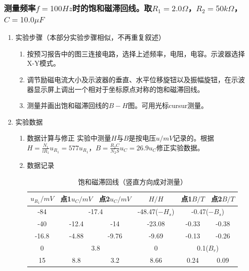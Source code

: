 \documentclass[11pt]{article}
\begin{document}
\subsubsection{测量频率$f=100Hz$时的饱和磁滞回线。取$R_1=2.0\Omega$，$R_2=50k\Omega$，$C=10.0\mu F$}
\begin{enumerate}
    \item 实验步骤（本部分实验步骤相似，不再重复叙述）
    \begin{enumerate}
        \item 按预习报告中的图三连接电路，选择上述频率，电阻，电容。示波器选择X-Y模式。
        \item 调节励磁电流大小及示波器的垂直、水平位移旋钮以及振幅旋钮，在示波器显示屏上调出一个相对于坐标原点对称的饱和磁滞回线。
        \item 测量并画出饱和磁滞回线的$B-H$图。可用光标cursur测量。
    \end{enumerate}
    \item 实验数据
    \begin{enumerate}
        \item 数据计算与修正
        \newline \hspace*{2em}实验中测量$H$与$B$是按电压$u/mV$记录的。根据$H=\frac{N_1}{lR_1}u_{R_1}=577u_{R_1}$，$B=\frac{R_2C}{N_2S}u_C=26.9u_C$修正实验数据。
        \item 数据记录
        \begin{table}[H]
          \centering
          \caption{饱和磁滞回线（竖直方向成对测量）}
            \begin{tabular}{|c|c|c|c|c|c|}\hline
            $u_{R_1}/mV$ & 点1$u_C/mV$ & 点2$u_C/mV$ & $H/H$ & 点1$B/T$ & 点2$B/T$ \\\hline
            -84    & \multicolumn{2}{|c|}{-17.4} & -48.47($-H_s$) & \multicolumn{2}{|c|}{-0.47($-B_s$)} \\\hline
            -40    & \multicolumn{1}{|c|}{-12.4} & \multicolumn{1}{|c|}{-14} & -23.08 & -0.33  & -0.38 \\\hline
            -16.8  & \multicolumn{1}{|c|}{-4.88} & \multicolumn{1}{|c|}{-9.76} & -9.69  & -0.13  & -0.26 \\\hline
            0      & \multicolumn{2}{|c|}{3.8} & 0      & \multicolumn{2}{|c|}{0.1($B_r$)} \\\hline
            15     & \multicolumn{1}{|c|}{8.8} & \multicolumn{1}{|c|}{3.2} & 8.66   & 0.24   & 0.09 \\\hline

\end{tabular}
\end{table}
\end{enumerate}
\end{enumerate}
\end{document}
